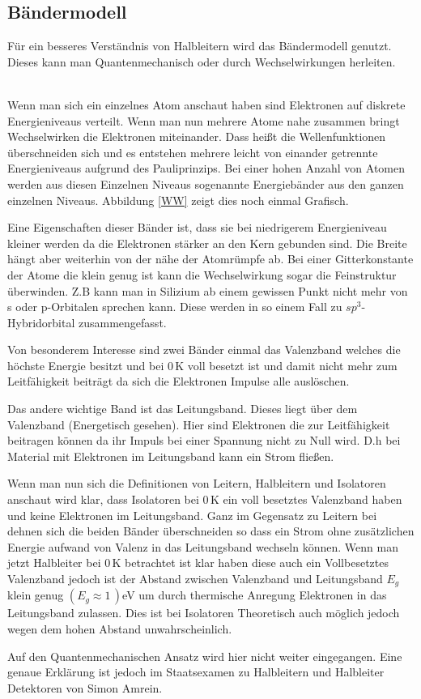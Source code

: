 \subsection{Bändermodell}
Für ein besseres Verständnis von Halbleitern wird das Bändermodell genutzt. Dieses kann man Quantenmechanisch oder durch Wechselwirkungen herleiten.\par 
\\
Wenn man sich ein einzelnes Atom anschaut haben sind Elektronen auf diskrete  Energieniveaus verteilt. Wenn man nun mehrere Atome nahe zusammen bringt Wechselwirken die Elektronen miteinander. Dass heißt die Wellenfunktionen überschneiden sich und es entstehen mehrere leicht von einander getrennte Energieniveaus aufgrund des Pauliprinzips. Bei einer hohen Anzahl von Atomen werden aus diesen Einzelnen Niveaus sogenannte Energiebänder aus den ganzen einzelnen Niveaus.
Abbildung \ref{WW} zeigt dies noch einmal Grafisch.\par
Eine Eigenschaften dieser Bänder ist, dass sie bei niedrigerem Energieniveau kleiner werden da die Elektronen stärker an den Kern gebunden sind. Die Breite hängt aber weiterhin von der nähe der Atomrümpfe ab. Bei einer Gitterkonstante der Atome die klein genug ist kann die Wechselwirkung sogar die Feinstruktur überwinden. Z.B kann man in Silizium ab einem gewissen Punkt nicht mehr von s oder p-Orbitalen sprechen kann. Diese werden in so einem Fall zu $sp^3$-Hybridorbital zusammengefasst.\par
Von besonderem Interesse sind zwei Bänder einmal das Valenzband welches die höchste Energie besitzt und bei $0$\,K voll besetzt ist und damit nicht mehr zum Leitfähigkeit beiträgt da sich die Elektronen Impulse alle auslöschen.\par
Das andere wichtige Band ist das Leitungsband. Dieses liegt über dem Valenzband (Energetisch gesehen). Hier sind Elektronen die zur Leitfähigkeit beitragen können da ihr Impuls bei einer Spannung nicht zu Null wird. D.h bei Material mit Elektronen im Leitungsband kann ein Strom fließen.\par
Wenn man nun sich die Definitionen von Leitern, Halbleitern und Isolatoren anschaut wird klar, dass Isolatoren bei $0\,$K ein voll besetztes Valenzband haben und keine Elektronen im Leitungsband. Ganz im Gegensatz zu Leitern bei dehnen sich die beiden Bänder überschneiden so dass ein Strom ohne zusätzlichen Energie aufwand von Valenz in das Leitungsband wechseln können. Wenn man jetzt Halbleiter bei $0$\,K betrachtet ist klar haben diese auch ein Vollbesetztes Valenzband jedoch ist der Abstand zwischen Valenzband und Leitungsband $E_g$ klein genug $(E_g\approx1\,)$eV um durch thermische Anregung Elektronen in das Leitungsband zulassen. Dies ist bei Isolatoren Theoretisch auch möglich jedoch wegen dem hohen Abstand unwahrscheinlich.\par
Auf den Quantenmechanischen Ansatz wird hier nicht weiter eingegangen. Eine genaue Erklärung ist jedoch im Staatsexamen zu Halbleitern und Halbleiter Detektoren von Simon Amrein.  \cite{Staatsexamen}\\
